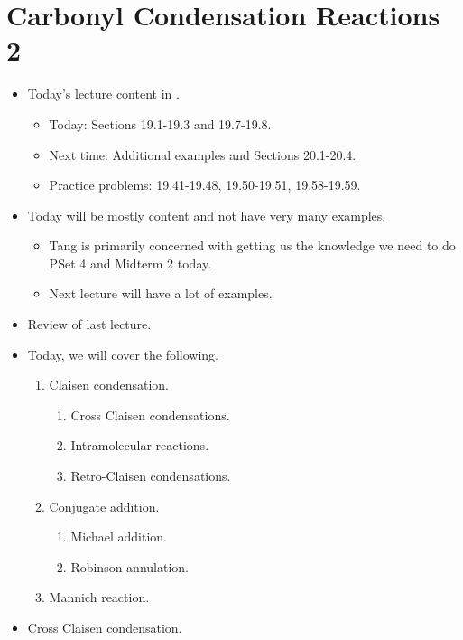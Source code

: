 \documentclass[../notes.tex]{subfiles}
\begin{document}
\section{Carbonyl Condensation Reactions 2}
\begin{itemize}
    \item {}Today's lecture content in \textcite{bib:SolomonsEtAl}.
    \begin{itemize}
        \item Today: Sections 19.1-19.3 and 19.7-19.8.
        \item Next time: Additional examples and Sections 20.1-20.4.
        \item Practice problems: 19.41-19.48, 19.50-19.51, 19.58-19.59.
    \end{itemize}
    \item Today will be mostly content and not have very many examples.
    \begin{itemize}
        \item Tang is primarily concerned with getting us the knowledge we need to do PSet 4 and Midterm 2 today.
        \item Next lecture will have a lot of examples.
    \end{itemize}
    \item Review of last lecture.
    \item Today, we will cover the following.
    \begin{enumerate}[label={\Roman*.}]
        \item Claisen condensation.
        \begin{enumerate}[label={\Alph*.}]
            \item Cross Claisen condensations.
            \item Intramolecular reactions.
            \item Retro-Claisen condensations.
        \end{enumerate}
        \item Conjugate addition.
        \begin{enumerate}[label={\Alph*.}]
            \item Michael addition.
            \item Robinson annulation.
        \end{enumerate}
        \item Mannich reaction.
    \end{enumerate}
    \item Cross Claisen condensation.

\end{itemize}
\end{document}
